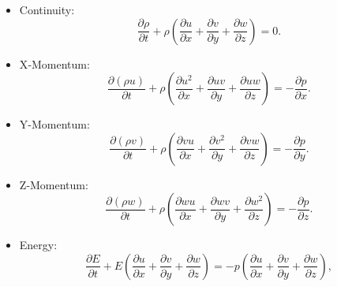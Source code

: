 \documentclass[11pt]{article}
\begin{document}
\begin{itemize}
  \item Continuity:
        \begin{equation}
          \frac{\partial \rho}{\partial t}
          + \rho\!\left(
              \frac{\partial u}{\partial x}
            + \frac{\partial v}{\partial y}
            + \frac{\partial w}{\partial z}
          \right) = 0.
        \end{equation}

  \item X‑Momentum:
        \begin{equation}
          \frac{\partial (\rho u)}{\partial t}
          + \rho\!\left(
              \frac{\partial u^{2}}{\partial x}
            + \frac{\partial u v}{\partial y}
            + \frac{\partial u w}{\partial z}
          \right) = -\frac{\partial p}{\partial x}.
        \end{equation}

  \item Y-Momentum:
        \begin{equation}
          \frac{\partial (\rho v)}{\partial t}
          + \rho\!\left(
              \frac{\partial v u}{\partial x}
            + \frac{\partial v^{2}}{\partial y}
            + \frac{\partial v w}{\partial z}
          \right) = -\frac{\partial p}{\partial y}.
        \end{equation}

  \item Z‑Momentum:
        \begin{equation}
          \frac{\partial (\rho w)}{\partial t}
          + \rho\!\left(
              \frac{\partial w u}{\partial x}
            + \frac{\partial w v}{\partial y}
            + \frac{\partial w^{2}}{\partial z}
          \right) = -\frac{\partial p}{\partial z}.
        \end{equation}

  \item Energy:
        \begin{equation}
          \frac{\partial E}{\partial t}
          + E\!\left(
              \frac{\partial u}{\partial x}
            + \frac{\partial v}{\partial y}
            + \frac{\partial w}{\partial z}
          \right) = -p\!\left(
              \frac{\partial u}{\partial x}
            + \frac{\partial v}{\partial y}
            + \frac{\partial w}{\partial z}
          \right),
        \end{equation}
\end{itemize}
\end{document}
